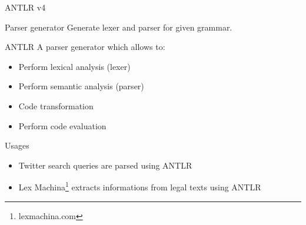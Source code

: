 \documentclass{beamer}
\begin{document}
\begin{frame}{ANTLR v4}
	
\begin{block}{Parser generator}
Generate lexer and parser for given grammar.
\end{block}	
	
\begin{block}{ANTLR}
A parser generator which allows to:
\begin{itemize}
	\item Perform lexical analysis (lexer)
	\item Perform semantic analysis (parser)
	\item Code transformation
	\item Perform code evaluation
\end{itemize}
\end{block}

\begin{exampleblock}{Usages}
	\begin{itemize}
		\item Twitter search queries are parsed using ANTLR
		\item Lex Machina\footnote{lexmachina.com} extracts informations from legal texts using ANTLR
	\end{itemize}
\end{exampleblock}
	
\end{frame}
\end{document}
